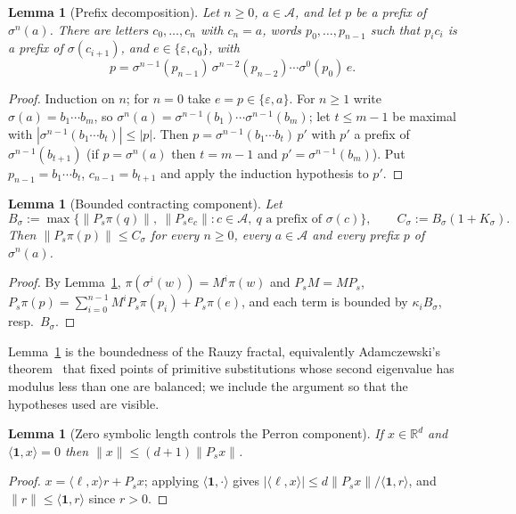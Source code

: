 \documentclass[11pt]{amsart}
\theoremstyle{plain}
\newtheorem{lemma}[theorem]{Lemma}
\theoremstyle{definition}
\theoremstyle{remark}
\newcommand{\R}{\mathbb{R}}
\newcommand{\A}{\mathcal{A}}
\begin{document}
\begin{lemma}[Prefix decomposition]\label{lem:prefix-decomp}
Let $n\ge0$, $a\in\A$, and let $p$ be a prefix of $\sigma^n(a)$. There are letters $c_0,\dots,c_n$ with $c_n=a$, words $p_0,\dots,p_{n-1}$ such that $p_ic_i$ is a prefix of $\sigma(c_{i+1})$, and $e\in\{\varepsilon,c_0\}$, with
\[p=\sigma^{n-1}(p_{n-1})\,\sigma^{n-2}(p_{n-2})\cdots\sigma^0(p_0)\,e.\]
\end{lemma}
\begin{proof}
Induction on $n$; for $n=0$ take $e=p\in\{\varepsilon,a\}$. For $n\ge1$ write $\sigma(a)=b_1\cdots b_m$, so $\sigma^n(a)=\sigma^{n-1}(b_1)\cdots\sigma^{n-1}(b_m)$; let $t\le m-1$ be maximal with $|\sigma^{n-1}(b_1\cdots b_t)|\le|p|$. Then $p=\sigma^{n-1}(b_1\cdots b_t)\,p'$ with $p'$ a prefix of $\sigma^{n-1}(b_{t+1})$ (if $p=\sigma^n(a)$ then $t=m-1$ and $p'=\sigma^{n-1}(b_m)$). Put $p_{n-1}=b_1\cdots b_t$, $c_{n-1}=b_{t+1}$ and apply the induction hypothesis to $p'$.
\end{proof}

\begin{lemma}[Bounded contracting component]\label{lem:rauzy-bounded}
Let
\begin{equation}\label{eq:Csigma}
B_\sigma:=\max\bigl\{\|P_s\pi(q)\|,\ \|P_se_c\|: c\in\A,\ q\text{ a prefix of }\sigma(c)\bigr\},\qquad C_\sigma:=B_\sigma(1+K_\sigma).
\end{equation}
Then $\|P_s\pi(p)\|\le C_\sigma$ for every $n\ge0$, every $a\in\A$ and every prefix $p$ of $\sigma^n(a)$.
\end{lemma}
\begin{proof}
By Lemma~\ref{lem:prefix-decomp}, $\pi(\sigma^i(w))=M^i\pi(w)$ and $P_sM=MP_s$, $P_s\pi(p)=\sum_{i=0}^{n-1}M^iP_s\pi(p_i)+P_s\pi(e)$, and each term is bounded by $\kappa_iB_\sigma$, resp.\ $B_\sigma$.
\end{proof}

Lemma~\ref{lem:rauzy-bounded} is the boundedness of the Rauzy fractal, equivalently Adamczewski's theorem~\cite{Adam} that fixed points of primitive substitutions whose second eigenvalue has modulus less than one are balanced; we include the argument so that the hypotheses used are visible.

\begin{lemma}[Zero symbolic length controls the Perron component]\label{lem:zero-length}
If $x\in\R^d$ and $\langle\mathbf 1,x\rangle=0$ then $\|x\|\le(d+1)\|P_sx\|$.
\end{lemma}
\begin{proof}
$x=\langle\ell,x\rangle r+P_sx$; applying $\langle\mathbf 1,\cdot\rangle$ gives $|\langle\ell,x\rangle|\le d\|P_sx\|/\langle\mathbf 1,r\rangle$, and $\|r\|\le\langle\mathbf 1,r\rangle$ since $r>0$.
\end{proof}
\end{document}
